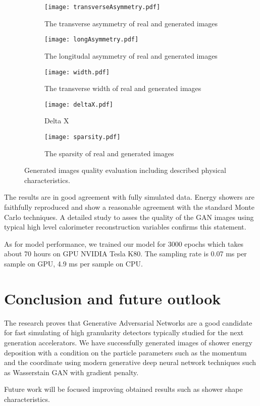 \documentclass{webofc}
\begin{document}
\begin{figure}
  \centering
  \centering
  \begin{subfigure}{0.19\textwidth}
    \centering
    \texttt{[image: transverseAsymmetry.pdf]}
    \caption{The transverse asymmetry of real and generated images}
  \end{subfigure}
  \begin{subfigure}{0.19\textwidth}
    \centering
    \texttt{[image: longAsymmetry.pdf]}
    \caption{The longitudal asymmetry of real and generated images}
  \end{subfigure}
  \begin{subfigure}{0.19\textwidth}
    \centering
    \texttt{[image: width.pdf]}
    \caption{The transverse width of real and generated images}
  \end{subfigure}
  \begin{subfigure}{0.19\textwidth}
    \centering
    \texttt{[image: deltaX.pdf]}
    \caption{Delta X}
  \end{subfigure}
  \begin{subfigure}{0.19\textwidth}
    \centering
    \texttt{[image: sparsity.pdf]}
    \caption{The sparsity of real and generated images}
  \end{subfigure}
  \caption{Generated images quality evaluation including described physical characteristics.}\label{fig:quality}  
\end{figure}

The results are in good agreement with fully simulated data. Energy showers are faithfully reproduced and show a reasonable agreement with the standard Monte Carlo techniques. A detailed study to asses the quality of the GAN images using typical high level calorimeter reconstruction variables confirms this statement.

As for model performance, we trained our model for 3000 epochs which takes about 70 hours on GPU NVIDIA Tesla K80. The sampling rate is 0.07 ms per sample on GPU, 4.9 ms per sample on CPU.

\section{Conclusion and future outlook}\label{conclusion}
The research proves that Generative Adversarial Networks are a good candidate for fast simulating of high granularity detectors typically studied for the next generation accelerators. We have successfully generated images of shower energy deposition with a condition on the particle parameters such as the momentum and the coordinate using modern generative deep neural network techniques such as Wasserstain GAN with gradient penalty.

Future work will be focused improving obtained results such as shower shape characteristics.




\appendix
\end{document}
